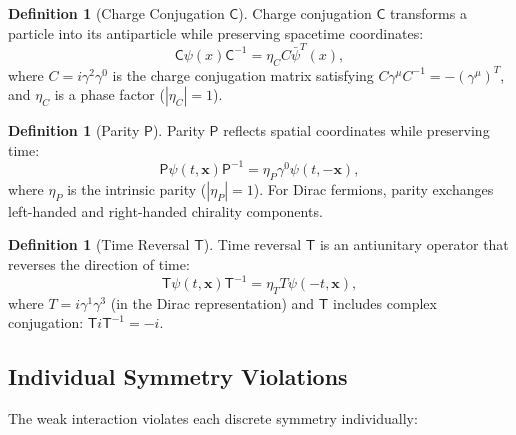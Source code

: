 \documentclass[12pt]{article}
\theoremstyle{definition}
\newtheorem{definition}[theorem]{Definition}
\theoremstyle{remark}
\newcommand{\C}{\mathsf{C}}
\newcommand{\PP}{\mathsf{P}}
\newcommand{\T}{\mathsf{T}}
\newcommand{\psibar}{\bar{\psi}}
\begin{document}
\begin{definition}[Charge Conjugation $\C$]
\label{def:charge_conj}
Charge conjugation $\C$ transforms a particle into its antiparticle while preserving
spacetime coordinates:
\begin{equation}
\C \psi(x) \C^{-1} = \eta_C C \psibar^T(x),
\end{equation}
where $C = i\gamma^2 \gamma^0$ is the charge conjugation matrix satisfying
$C \gamma^\mu C^{-1} = -(\gamma^\mu)^T$, and $\eta_C$ is a phase factor
($|\eta_C| = 1$).
\end{definition}

\begin{definition}[Parity $\PP$]
\label{def:parity}
Parity $\PP$ reflects spatial coordinates while preserving time:
\begin{equation}
\PP \psi(t, \mathbf{x}) \PP^{-1} = \eta_P \gamma^0 \psi(t, -\mathbf{x}),
\end{equation}
where $\eta_P$ is the intrinsic parity ($|\eta_P| = 1$). For Dirac fermions,
parity exchanges left-handed and right-handed chirality components.
\end{definition}

\begin{definition}[Time Reversal $\T$]
\label{def:time_reversal}
Time reversal $\T$ is an antiunitary operator that reverses the direction of time:
\begin{equation}
\T \psi(t, \mathbf{x}) \T^{-1} = \eta_T T \psi(-t, \mathbf{x}),
\end{equation}
where $T = i\gamma^1 \gamma^3$ (in the Dirac representation) and $\T$ includes
complex conjugation: $\T i \T^{-1} = -i$.
\end{definition}

\subsection{Individual Symmetry Violations}

The weak interaction violates each discrete symmetry individually:
\end{document}
